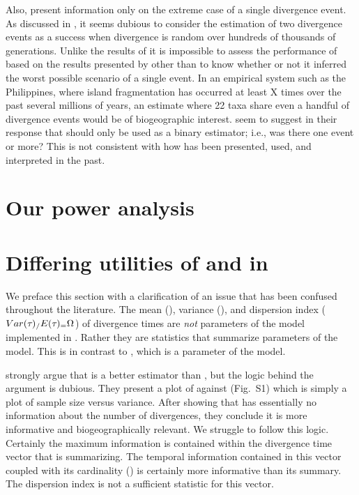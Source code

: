 \documentclass[letterpaper,12pt]{article}
\begin{document}
\begin{linenumbers}
Also, \citet{Hickerson2013} present information only on the extreme case of a
single divergence event.
As discussed in \citet{Oaks2012}, it seems dubious to consider the estimation
of two divergence events as a success when divergence is random over hundreds
of thousands of generations.
Unlike the results of \citet{Oaks2012} it is impossible to assess the
performance of \msb based on the results presented by \cite{Hickerson2013}
other than to know whether or not it inferred the worst possible scenario of a
single event.
In an empirical system such as the Philippines, where island fragmentation
has occurred at least X times over the past several millions of years, an
estimate where 22 taxa share even a handful of divergence events would be
of biogeographic interest.
\citet{Hickerson2013} seem to suggest in their response that \msb should only
be used as a binary estimator; i.e., was there one event or more?
This is not consistent with how \msb has been presented, used, and interpreted
in the past.

\section*{Our power analysis}


\section*{Differing utilities of \numt{} and \vmratio{} in \msb}
We preface this section with a clarification of an issue that has
been confused throughout the \msb literature.
The mean (\meant{}), variance (\vart{}), and dispersion index
($Var(\tau_{}{})_{/}E(\tau_{})_{=} \Omega_{}$) of divergence times are \emph{not} parameters
of the model implemented in \msb.
Rather they are statistics that summarize parameters of the model.
This is in contrast to \numt{}, which is a parameter of the model.

\citet{Hickerson2013} strongly argue that \vmratio{} is a better estimator than
\numt{}, but the logic behind the argument is dubious.
They present a plot of \numt{} against \vmratio{} (Fig.~S1) which is simply a
plot of sample size versus variance.
After showing that \vmratio{} has essentially no information about the
number of divergences, they conclude it is more informative and biogeographically
relevant.
We struggle to follow this logic.
Certainly the maximum information is contained within the divergence time
vector that \vmratio{} is summarizing.
The temporal information contained in this vector coupled with its cardinality
(\numt{}) is certainly more informative than its summary.
The dispersion index is not a sufficient statistic for this vector.


\end{linenumbers}
\end{document}

